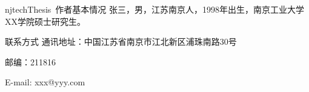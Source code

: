 
\begin{resume}

\begin{resumesection}{njtechThesis~作者基本情况}
张三，男，江苏南京人，1998年出生，南京工业大学XX学院硕士研究生。
\end{resumesection}

\begin{resumelist}{联系方式}
通讯地址：中国江苏省南京市江北新区浦珠南路30号

邮编：211816

E-mail: xxx@yyy.com
\end{resumelist}

\end{resume}
